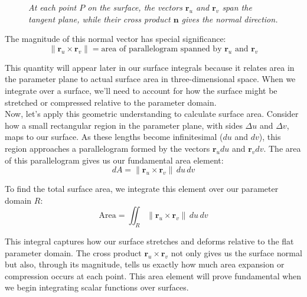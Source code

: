 \begin{figure}[H]
\caption{\textit{At each point $P$ on the surface, the vectors $\mathbf{r}_u$ and $\mathbf{r}_v$ span the tangent plane, while their cross product $\mathbf{n}$ gives the normal direction.}}
\label{fig:tangent_plane}
\end{figure}

\noindent The magnitude of this normal vector has special significance:
\[
\|\mathbf{r}_u \times \mathbf{r}_v\| = \text{area of parallelogram spanned by } \mathbf{r}_u \text{ and } \mathbf{r}_v
\]

\noindent This quantity will appear later in our surface integrals because it relates area in the parameter plane to actual surface area in three-dimensional space. When we integrate over a surface, we'll need to account for how the surface might be stretched or compressed relative to the parameter domain. \\

\noindent Now, let's apply this geometric understanding to calculate surface area. Consider how a small rectangular region in the parameter plane, with sides $\Delta u$ and $\Delta v$, maps to our surface. As these lengths become infinitesimal ($du$ and $dv$), this region approaches a parallelogram formed by the vectors $\mathbf{r}_u du$ and $\mathbf{r}_v dv$. The area of this parallelogram gives us our fundamental area element:
\[
dA = \|\mathbf{r}_u \times \mathbf{r}_v\|\,du\,dv
\]

\noindent To find the total surface area, we integrate this element over our parameter domain $R$:
\[
\text{Area} = \iint_R \|\mathbf{r}_u \times \mathbf{r}_v\|\,du\,dv
\]

\noindent This integral captures how our surface stretches and deforms relative to the flat parameter domain. The cross product $\mathbf{r}_u \times \mathbf{r}_v$ not only gives us the surface normal but also, through its magnitude, tells us exactly how much area expansion or compression occurs at each point. This area element will prove fundamental when we begin integrating scalar functions over surfaces.

